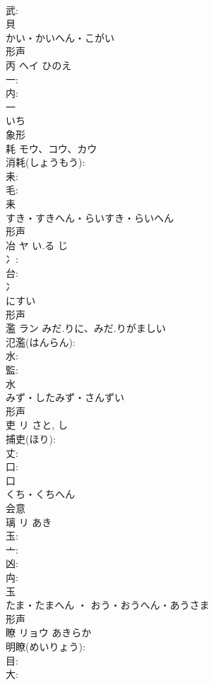 \documentclass[8pt]{extreport}
\begin{document}
\begin{CJK}{UTF8}{min}
\\	武: 
\\	貝	
\\	かい・かいへん・こがい	
\\	形声 
\\	丙	ヘイ	ひのえ		
\\	一: 
\\	内: 
\\	一	
\\	いち	
\\	象形 
\\	耗	モウ、コウ、カウ			
\\	消耗(しょうもう): 
\\	耒: 
\\	毛: 
\\	耒	
\\	すき・すきへん・らいすき・らいへん	
\\	形声 
\\	冶	ヤ	い.る	じ	
\\	冫: 
\\	台: 
\\	冫	
\\	にすい	
\\	形声 
\\	濫	ラン	みだ.りに、みだ.りがましい		
\\	氾濫(はんらん): 
\\	水: 
\\	監: 
\\	水	
\\	みず・したみず・さんずい	
\\	形声 
\\	吏	リ		さと, し	
\\	捕吏(ほり): 
\\	丈: 
\\	口: 
\\	口	
\\	くち・くちへん	
\\	会意 
\\	璃	リ		あき	
\\	玉: 
\\	亠: 
\\	凶: 
\\	禸: 
\\	玉	
\\	たま・たまへん ・ おう・おうへん・あうさま	
\\	形声 
\\	瞭	リョウ	あきらか		
\\	明瞭(めいりょう): 
\\	目: 
\\	大: 

\end{CJK}
\end{document}
